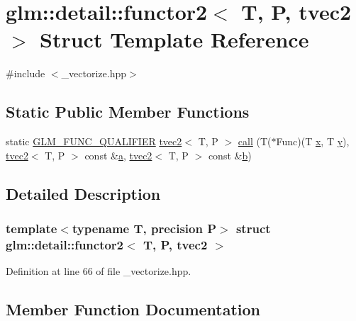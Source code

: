 \hypertarget{structglm_1_1detail_1_1functor2_3_01_t_00_01_p_00_01tvec2_01_4}{}\section{glm\+::detail\+::functor2$<$ T, P, tvec2 $>$ Struct Template Reference}
\label{structglm_1_1detail_1_1functor2_3_01_t_00_01_p_00_01tvec2_01_4}


{\ttfamily \#include $<$\+\_\+vectorize.\+hpp$>$}

\subsection*{Static Public Member Functions}
\begin{DoxyCompactItemize}
\item 
static \mbox{\hyperlink{setup_8hpp_a33fdea6f91c5f834105f7415e2a64407}{G\+L\+M\+\_\+\+F\+U\+N\+C\+\_\+\+Q\+U\+A\+L\+I\+F\+I\+ER}} \mbox{\hyperlink{structglm_1_1tvec2}{tvec2}}$<$ T, P $>$ \mbox{\hyperlink{structglm_1_1detail_1_1functor2_3_01_t_00_01_p_00_01tvec2_01_4_a3f747eea2648beb35126086723c1797f}{call}} (T($\ast$Func)(T \mbox{\hyperlink{glad_8h_a92d0386e5c19fb81ea88c9f99644ab1d}{x}}, T \mbox{\hyperlink{glad_8h_a66ddd433d2cacfe27f5906b7e86faeed}{y}}), \mbox{\hyperlink{structglm_1_1tvec2}{tvec2}}$<$ T, P $>$ const \&\mbox{\hyperlink{glad_8h_ac8729153468b5dcf13f971b21d84d4e5}{a}}, \mbox{\hyperlink{structglm_1_1tvec2}{tvec2}}$<$ T, P $>$ const \&\mbox{\hyperlink{glad_8h_a6eba317e3cf44d6d26c04a5a8f197dcb}{b}})
\end{DoxyCompactItemize}


\subsection{Detailed Description}
\subsubsection*{template$<$typename T, precision P$>$\newline
struct glm\+::detail\+::functor2$<$ T, P, tvec2 $>$}



Definition at line 66 of file \+\_\+vectorize.\+hpp.



\subsection{Member Function Documentation}
\mbox{\label{structglm_1_1detail_1_1functor2_3_01_t_00_01_p_00_01tvec2_01_4_a3f747eea2648beb35126086723c1797f}} 
